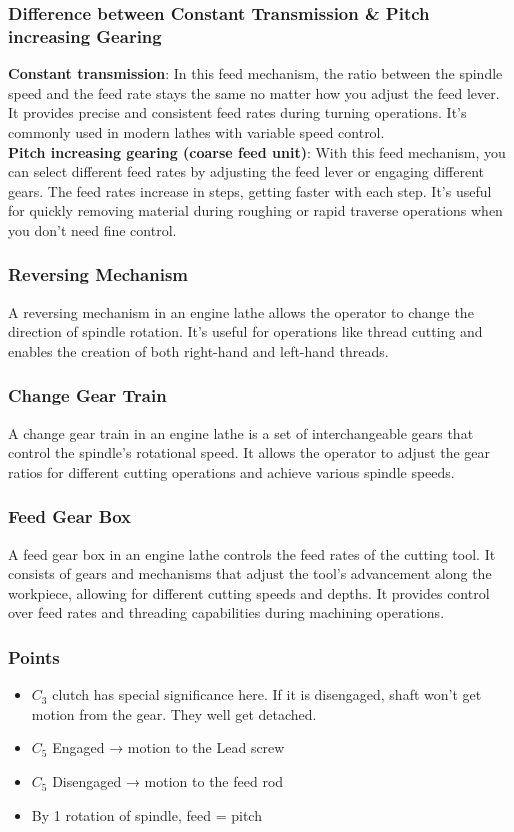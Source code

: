 \documentclass{article}
\begin{document}
\subsubsection*{Difference between Constant Transmission \& Pitch increasing Gearing}
\textbf{Constant transmission}: In this feed mechanism, the ratio between the spindle speed and the feed rate stays the same no matter how you adjust the feed lever. It provides precise and consistent feed rates during turning operations. It's commonly used in modern lathes with variable speed control.\\

\textbf{Pitch increasing gearing (coarse feed unit)}: With this feed mechanism, you can select different feed rates by adjusting the feed lever or engaging different gears. The feed rates increase in steps, getting faster with each step. It's useful for quickly removing material during roughing or rapid traverse operations when you don't need fine control.

\subsubsection*{Reversing Mechanism}
A reversing mechanism in an engine lathe allows the operator to change the direction of spindle rotation. It's useful for operations like thread cutting and enables the creation of both right-hand and left-hand threads.

\subsubsection*{Change Gear Train}
A change gear train in an engine lathe is a set of interchangeable gears that control the spindle's rotational speed. It allows the operator to adjust the gear ratios for different cutting operations and achieve various spindle speeds.

\subsubsection*{Feed Gear Box}
A feed gear box in an engine lathe controls the feed rates of the cutting tool. It consists of gears and mechanisms that adjust the tool's advancement along the workpiece, allowing for different cutting speeds and depths. It provides control over feed rates and threading capabilities during machining operations.

\subsubsection*{Points}
\begin{itemize}
  \item $C_3$ clutch has special significance here. If it is disengaged, shaft won't get motion from the gear. They well get detached. 
  \item $C_5$ Engaged → motion to the Lead screw
  \item $C_5$ Disengaged → motion to the feed rod 
  \item By 1 rotation of spindle, feed = pitch 
\end{itemize}
\end{document}
